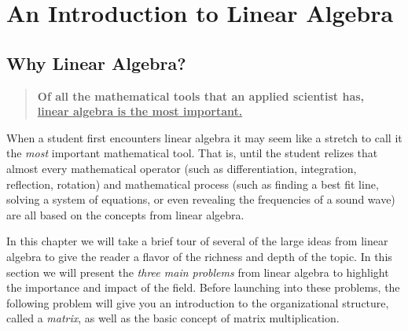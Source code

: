 \chapter{An Introduction to Linear Algebra}

\section{Why Linear Algebra?}
\begin{quote}
    {\bf Of all the mathematical tools that an applied scientist has,\\ \underline{linear algebra is the
    most important.}}
\end{quote}

When a student first encounters linear algebra it may seem like a stretch to call it the
{\it most} important mathematical tool.  That is, until the student relizes that almost
every mathematical operator (such as differentiation, integration, reflection, rotation) and
mathematical process (such as finding a best fit line, solving a system of equations, or
even revealing the frequencies of a sound wave) are all based on the concepts from linear
algebra.  

In this chapter we will take a brief tour of several of the large ideas from linear
algebra to give the reader a flavor of the richness and depth of the topic.  In this
section we will present the {\it three main problems} from linear algebra to highlight the
importance and impact of the field.  Before launching into these problems, the following
problem will give you an introduction to the organizational structure, called a
{\it matrix}, as well as the basic concept of matrix multiplication.

